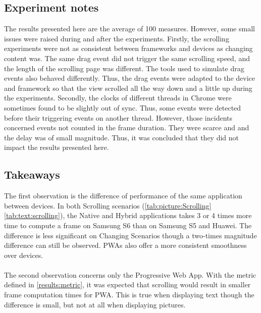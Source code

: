 \documentclass{kththesis}
\begin{document}
\subsection{Experiment notes}
The results presented here are the average of 100 measures. However, some small issues were raised during and after the experiments.\newline
Firstly, the scrolling experiments were not as consistent between frameworks and devices as changing content was. The same drag event did not trigger the same scrolling speed, and the length of the scrolling page was different. The tools used to simulate drag events also behaved  differently. Thus, the drag events were adapted to the device and framework so that the view scrolled all the way down and a little up during the experiments. \newline
Secondly, the clocks of different threads in Chrome were sometimes found to be slightly out of sync. Thus, some events were detected before their triggering events on another thread. However, those incidents concerned events not counted in the frame duration. They were scarce and and the delay was of small magnitude. Thus, it was concluded that they did not impact the results presented here.

\subsection{Takeaways}
\label{results:performance}
The first observation is the difference of performance of the same application between devices. In both Scrolling scenarios (\autoref{tab:picture:Scrolling} \autoref{tab:text:scrolling}), the Native and Hybrid applications takes 3 or 4 times more time to compute a frame on Samsung S6 than on Samsung S5 and Huawei. The difference is less significant on Changing Scenarios though a two-times magnitude difference can still be observed. PWAs also offer a more consistent smoothness over devices.
\paragraph{}
The second observation concerns only the Progressive Web App. With the metric defined in \autoref{results:metric}, it was expected that scrolling would result in smaller frame computation times for PWA. This is true when displaying text though the difference is small, but not at all when displaying pictures. 

\end{document}

